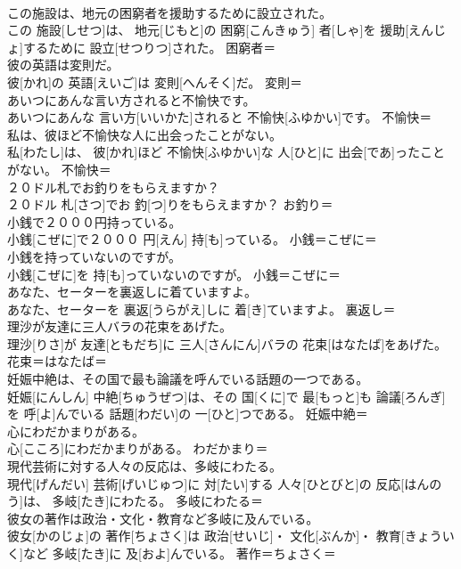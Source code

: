 \documentclass[8pt]{extreport}
\begin{document}
\begin{CJK}{UTF8}{min}
\\	この施設は、地元の困窮者を援助するために設立された。	
\\	この 施設[しせつ]は、 地元[じもと]の 困窮[こんきゅう] 者[しゃ]を 援助[えんじょ]するために 設立[せつりつ]された。	困窮者＝ 
\\	彼の英語は変則だ。	
\\	彼[かれ]の 英語[えいご]は 変則[へんそく]だ。	変則＝ 
\\	あいつにあんな言い方されると不愉快です。	
\\	あいつにあんな 言い方[いいかた]されると 不愉快[ふゆかい]です。	不愉快＝ 
\\	私は、彼ほど不愉快な人に出会ったことがない。	
\\	私[わたし]は、 彼[かれ]ほど 不愉快[ふゆかい]な 人[ひと]に 出会[であ]ったことがない。	不愉快＝ 
\\	２０ドル札でお釣りをもらえますか？	
\\	２０ドル 札[さつ]でお 釣[つ]りをもらえますか？	お釣り＝ 
\\	小銭で２０００円持っている。	
\\	小銭[こぜに]で２０００ 円[えん] 持[も]っている。	小銭＝こぜに＝ 
\\	小銭を持っていないのですが。	
\\	小銭[こぜに]を 持[も]っていないのですが。	小銭＝こぜに＝ 
\\	あなた、セーターを裏返しに着ていますよ。	
\\	あなた、セーターを 裏返[うらがえ]しに 着[き]ていますよ。	裏返し＝ 
\\	理沙が友達に三人バラの花束をあげた。	
\\	理沙[りさ]が 友達[ともだち]に 三人[さんにん]バラの 花束[はなたば]をあげた。	花束＝はなたば＝ 
\\	妊娠中絶は、その国で最も論議を呼んでいる話題の一つである。	
\\	妊娠[にんしん] 中絶[ちゅうぜつ]は、その 国[くに]で 最[もっと]も 論議[ろんぎ]を 呼[よ]んでいる 話題[わだい]の 一[ひと]つである。	妊娠中絶＝ 
\\	心にわだかまりがある。	
\\	心[こころ]にわだかまりがある。	わだかまり＝ 
\\	現代芸術に対する人々の反応は、多岐にわたる。	
\\	現代[げんだい] 芸術[げいじゅつ]に 対[たい]する 人々[ひとびと]の 反応[はんのう]は、 多岐[たき]にわたる。	多岐にわたる＝ 
\\	彼女の著作は政治・文化・教育など多岐に及んでいる。	
\\	彼女[かのじょ]の 著作[ちょさく]は 政治[せいじ]・ 文化[ぶんか]・ 教育[きょういく]など 多岐[たき]に 及[およ]んでいる。	著作＝ちょさく＝ 

\end{CJK}
\end{document}
